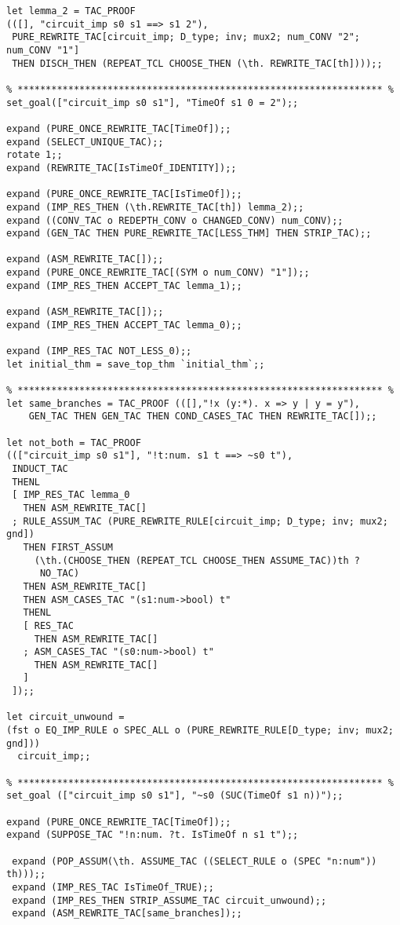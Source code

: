 \begin{verbatim}
let lemma_2 = TAC_PROOF
(([], "circuit_imp s0 s1 ==> s1 2"),
 PURE_REWRITE_TAC[circuit_imp; D_type; inv; mux2; num_CONV "2"; num_CONV "1"]
 THEN DISCH_THEN (REPEAT_TCL CHOOSE_THEN (\th. REWRITE_TAC[th])));;

% ***************************************************************** %
set_goal(["circuit_imp s0 s1"], "TimeOf s1 0 = 2");;

expand (PURE_ONCE_REWRITE_TAC[TimeOf]);;
expand (SELECT_UNIQUE_TAC);;
rotate 1;;
expand (REWRITE_TAC[IsTimeOf_IDENTITY]);;

expand (PURE_ONCE_REWRITE_TAC[IsTimeOf]);;
expand (IMP_RES_THEN (\th.REWRITE_TAC[th]) lemma_2);;
expand ((CONV_TAC o REDEPTH_CONV o CHANGED_CONV) num_CONV);;
expand (GEN_TAC THEN PURE_REWRITE_TAC[LESS_THM] THEN STRIP_TAC);;

expand (ASM_REWRITE_TAC[]);;
expand (PURE_ONCE_REWRITE_TAC[(SYM o num_CONV) "1"]);;
expand (IMP_RES_THEN ACCEPT_TAC lemma_1);;

expand (ASM_REWRITE_TAC[]);;
expand (IMP_RES_THEN ACCEPT_TAC lemma_0);;

expand (IMP_RES_TAC NOT_LESS_0);;
let initial_thm = save_top_thm `initial_thm`;;

% ***************************************************************** %
let same_branches = TAC_PROOF (([],"!x (y:*). x => y | y = y"),
	GEN_TAC THEN GEN_TAC THEN COND_CASES_TAC THEN REWRITE_TAC[]);;

let not_both = TAC_PROOF
((["circuit_imp s0 s1"], "!t:num. s1 t ==> ~s0 t"),
 INDUCT_TAC
 THENL
 [ IMP_RES_TAC lemma_0
   THEN ASM_REWRITE_TAC[]
 ; RULE_ASSUM_TAC (PURE_REWRITE_RULE[circuit_imp; D_type; inv; mux2; gnd])
   THEN FIRST_ASSUM
     (\th.(CHOOSE_THEN (REPEAT_TCL CHOOSE_THEN ASSUME_TAC))th ?
      NO_TAC)
   THEN ASM_REWRITE_TAC[]
   THEN ASM_CASES_TAC "(s1:num->bool) t"
   THENL
   [ RES_TAC
     THEN ASM_REWRITE_TAC[]
   ; ASM_CASES_TAC "(s0:num->bool) t"
     THEN ASM_REWRITE_TAC[]
   ]
 ]);;

let circuit_unwound =
(fst o EQ_IMP_RULE o SPEC_ALL o (PURE_REWRITE_RULE[D_type; inv; mux2; gnd]))
  circuit_imp;;

% ***************************************************************** %
set_goal (["circuit_imp s0 s1"], "~s0 (SUC(TimeOf s1 n))");;

expand (PURE_ONCE_REWRITE_TAC[TimeOf]);;
expand (SUPPOSE_TAC "!n:num. ?t. IsTimeOf n s1 t");;

 expand (POP_ASSUM(\th. ASSUME_TAC ((SELECT_RULE o (SPEC "n:num")) th)));;
 expand (IMP_RES_TAC IsTimeOf_TRUE);;
 expand (IMP_RES_THEN STRIP_ASSUME_TAC circuit_unwound);;
 expand (ASM_REWRITE_TAC[same_branches]);;


\end{verbatim}
